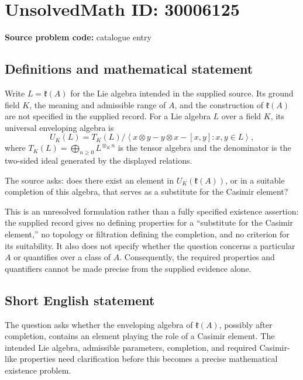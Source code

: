 \documentclass[11pt]{article}
\begin{document}
\section*{UnsolvedMath ID: 30006125}
\textbf{Source problem code:} catalogue entry
\subsection{Definitions and mathematical statement}
Write \(L=\mathfrak{k}(A)\) for the Lie algebra intended in the supplied source. Its ground field \(K\), the meaning and admissible range of \(A\), and the construction of \(\mathfrak{k}(A)\) are not specified in the supplied record. For a Lie algebra \(L\) over a field \(K\), its universal enveloping algebra is
\[
U_K(L)=T_K(L)\big/\left\langle x\otimes y-y\otimes x-[x,y]:x,y\in L\right\rangle,
\]
where \(T_K(L)=\bigoplus_{n\geq 0}L^{\otimes_K n}\) is the tensor algebra and the denominator is the two-sided ideal generated by the displayed relations.

The source asks: does there exist an element in \(U_K(\mathfrak{k}(A))\), or in a suitable completion of this algebra, that serves as a substitute for the Casimir element?

This is an unresolved formulation rather than a fully specified existence assertion: the supplied record gives no defining properties for a ``substitute for the Casimir element,'' no topology or filtration defining the completion, and no criterion for its suitability. It also does not specify whether the question concerns a particular \(A\) or quantifies over a class of \(A\). Consequently, the required properties and quantifiers cannot be made precise from the supplied evidence alone.
\subsection{Short English statement}
The question asks whether the enveloping algebra of \(\mathfrak{k}(A)\), possibly after completion, contains an element playing the role of a Casimir element. The intended Lie algebra, admissible parameters, completion, and required Casimir-like properties need clarification before this becomes a precise mathematical existence problem.
\end{document}
